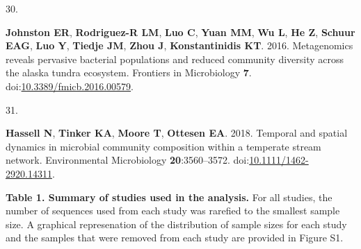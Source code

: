 \documentclass[
]{article}
\newlength{\cslhangindent}
\newlength{\csllabelwidth}
\newlength{\cslentryspacingunit} %
\newenvironment{CSLReferences}[2] %
 {%
  \setlength{\parindent}{0pt}
  \ifodd #1
  \let\oldpar\par
  \def\par{\hangindent=\cslhangindent\oldpar}
  \fi
  \setlength{\parskip}{#2\cslentryspacingunit}
 }%
 {}
\newcommand{\CSLLeftMargin}[1]{\parbox[t]{\csllabelwidth}{#1}}
\newcommand{\CSLRightInline}[1]{\parbox[t]{\linewidth - \csllabelwidth}{#1}\break}
\begin{document}
\begin{CSLReferences}{0}{1}
\leavevmode{}%
\CSLLeftMargin{30. }%
\CSLRightInline{\textbf{Johnston ER}, \textbf{Rodriguez-R LM},
\textbf{Luo C}, \textbf{Yuan MM}, \textbf{Wu L}, \textbf{He Z},
\textbf{Schuur EAG}, \textbf{Luo Y}, \textbf{Tiedje JM}, \textbf{Zhou
J}, \textbf{Konstantinidis KT}. 2016. Metagenomics reveals pervasive
bacterial populations and reduced community diversity across the alaska
tundra ecosystem. Frontiers in Microbiology \textbf{7}.
doi:\href{https://doi.org/10.3389/fmicb.2016.00579}{10.3389/fmicb.2016.00579}.}

\leavevmode{}%
\CSLLeftMargin{31. }%
\CSLRightInline{\textbf{Hassell N}, \textbf{Tinker KA}, \textbf{Moore
T}, \textbf{Ottesen EA}. 2018. Temporal and spatial dynamics in
microbial community composition within a temperate stream network.
Environmental Microbiology \textbf{20}:3560--3572.
doi:\href{https://doi.org/10.1111/1462-2920.14311}{10.1111/1462-2920.14311}.}

\end{CSLReferences}

\newpage

\textbf{Table 1. Summary of studies used in the analysis.} For all
studies, the number of sequences used from each study was rarefied to
the smallest sample size. A graphical represenation of the distribution
of sample sizes for each study and the samples that were removed from
each study are provided in Figure S1.

\small
\end{document}
